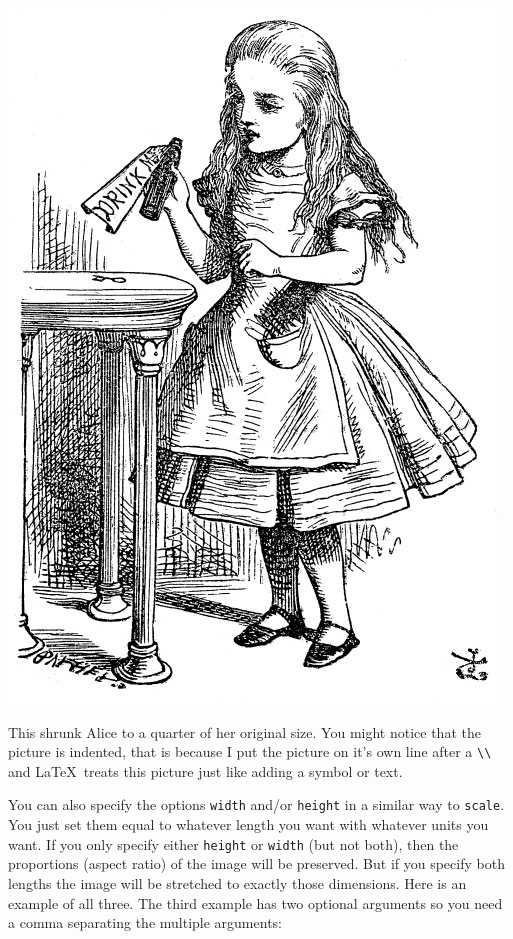 \documentclass{article}
\newcommand{\nid}{\noindent} %
\begin{document}
\includegraphics[scale=0.25]{alice}

\nid This shrunk Alice to a quarter of her original size.  You might notice that the picture is indented, that is because I put the picture on it's own line after a \verb|\\| and \LaTeX\ treats this picture just like adding a symbol or text.  

You can also specify the options \verb|width| and/or \verb|height| in a similar way to \verb|scale|.  You just set them equal to whatever length you want with whatever units you want. If you only specify either \texttt{height} or \texttt{width} (but not both), then the proportions (aspect ratio) of the image will be preserved.  But if you specify both lengths the image will be stretched to exactly those dimensions.  Here is an example of all three.  The third example has two optional arguments so you need a comma separating the multiple arguments:
\end{document}
